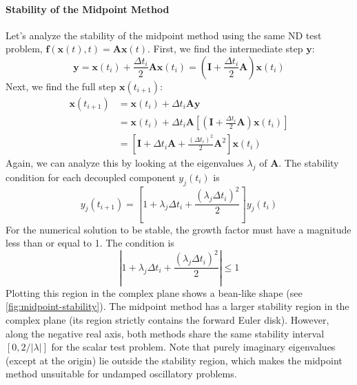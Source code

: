 \paragraph*{Stability of the Midpoint Method}
Let's analyze the stability of the midpoint method using the same ND test problem, $\mathbf{f}(\mathbf{x}(t), t) = \mathbf{A}\mathbf{x}(t)$. First, we find the intermediate step $\mathbf{y}$:
\begin{equation}
    \mathbf{y} = \mathbf{x}(t_i) + \frac{\Delta t_i}{2} \mathbf{A} \mathbf{x}(t_i) = \left(\mathbf{I} + \frac{\Delta t_i}{2} \mathbf{A}\right) \mathbf{x}(t_i)
\end{equation}
Next, we find the full step $\mathbf{x}(t_{i+1})$:
\begin{align}
    \mathbf{x}(t_{i+1}) &= \mathbf{x}(t_i) + \Delta t_i \mathbf{A} \mathbf{y} \nonumber \\
    &= \mathbf{x}(t_i) + \Delta t_i \mathbf{A} \left[ \left(\mathbf{I} + \frac{\Delta t_i}{2} \mathbf{A}\right) \mathbf{x}(t_i) \right] \nonumber \\
    &= \left[ \mathbf{I} + \Delta t_i \mathbf{A} + \frac{(\Delta t_i)^2}{2} \mathbf{A}^2 \right] \mathbf{x}(t_i)
\end{align}
Again, we can analyze this by looking at the eigenvalues $\lambda_j$ of $\mathbf{A}$. The stability condition for each decoupled component $y_j(t_i)$ is
\begin{equation}
    y_j(t_{i+1}) = \left[ 1 + \lambda_j \Delta t_i + \frac{(\lambda_j \Delta t_i)^2}{2} \right] y_j(t_i)
\end{equation}
For the numerical solution to be stable, the growth factor must have a magnitude less than or equal to 1. The condition is
\begin{equation}
    \left| 1 + \lambda_j \Delta t_i + \frac{(\lambda_j \Delta t_i)^2}{2} \right| \le 1
\end{equation}
Plotting this region in the complex plane shows a bean-like shape (see \autoref{fig:midpoint-stability}). The midpoint method has a larger stability region in the complex plane (its region strictly contains the forward Euler disk). However, along the negative real axis, both methods share the same stability interval $[0, 2/|\lambda|]$ for the scalar test problem. Note that purely imaginary eigenvalues (except at the origin) lie outside the stability region, which makes the midpoint method unsuitable for undamped oscillatory problems.

